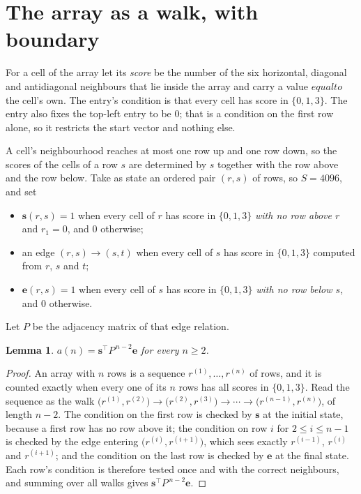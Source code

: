 \documentclass[11pt,a4paper]{article}
\theoremstyle{plain}
\newtheorem{lemma}[theorem]{Lemma}
\theoremstyle{definition}
\begin{document}
\section{The array as a walk, with boundary}

For a cell of the array let its \emph{score} be the number of the six horizontal, diagonal and antidiagonal neighbours that lie inside
the array and carry a value $equal to$ the cell's own. The entry's condition is that every cell
has score in $\{0,1,3\}$. The entry also fixes the top-left entry to be $0$; that is a condition on the first row alone, so it restricts the start vector and nothing else.

A cell's neighbourhood reaches at most one row up and one row down, so the scores of the
cells of a row $s$ are determined by $s$ together with the row above and the row below.
Take as state an ordered pair $(r,s)$ of rows, so $S=4096$, and set
\begin{itemize}
\item $\mathbf{s}(r,s)=1$ when every cell of $r$ has score in $\{0,1,3\}$ \emph{with no row
above $r$} and $r_1=0$, and $0$ otherwise;
\item an edge $(r,s)\to(s,t)$ when every cell of $s$ has score in $\{0,1,3\}$ computed from
$r$, $s$ and $t$;
\item $\mathbf{e}(r,s)=1$ when every cell of $s$ has score in $\{0,1,3\}$ \emph{with no row
below $s$}, and $0$ otherwise.
\end{itemize}
Let $P$ be the adjacency matrix of that edge relation.

\begin{lemma}\label{lem:walk}
$a(n)=\mathbf{s}^{\!\top}P^{\,n-2}\mathbf{e}$ for every $n\ge2$.
\end{lemma}

\begin{proof}
An array with $n$ rows is a sequence $r^{(1)},\dots,r^{(n)}$ of rows, and it is counted
exactly when every one of its $n$ rows has all scores in $\{0,1,3\}$. Read the sequence as the
walk $\bigl(r^{(1)},r^{(2)}\bigr)\to\bigl(r^{(2)},r^{(3)}\bigr)\to\cdots\to
\bigl(r^{(n-1)},r^{(n)}\bigr)$, of length $n-2$. The condition on the first row is
checked by $\mathbf{s}$ at the initial state, because a first row has no row above it; the
condition on row $i$ for $2\le i\le n-1$ is checked by the edge entering
$\bigl(r^{(i)},r^{(i+1)}\bigr)$, which sees exactly $r^{(i-1)}$, $r^{(i)}$ and
$r^{(i+1)}$; and the condition on the last row is checked by $\mathbf{e}$ at the final
state. Each row's condition is therefore tested once and with the correct neighbours, and
summing over all walks gives $\mathbf{s}^{\!\top}P^{\,n-2}\mathbf{e}$.
\end{proof}
\end{document}
